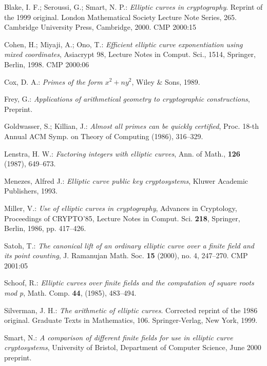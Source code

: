 \documentclass[final]{mcom-l}
\begin{document}

\begin{thebibliography}{10}

 Blake, I. F.; Seroussi, G.; Smart, N. P.: \emph{Elliptic curves in
cryptography}. Reprint of the 1999 original. London Mathematical
Society Lecture Note Series, 265. Cambridge University Press,
Cambridge, 2000. CMP {2000:15}

 Cohen, H.; Miyaji, A.; Ono, T.: \emph{Efficient elliptic curve
exponentiation using mixed coordinates}, Asiacrypt 98, Lecture
Notes in Comput. Sci., 1514, Springer, Berlin, 1998. CMP {2000:06}

 Cox, D. A.: \emph{Primes of the form $x^2+ny^2$}, Wiley \& Sons,
1989. 

 Frey, G.: \emph{Applications of arithmetical geometry to
cryptographic constructions}, Preprint.

 Goldwasser, S.; Killian, J.: \emph{Almost all primes can be quickly
certified}, Proc. 18-th Annual ACM Symp. on Theory of Computing (1986),
316--329.

 Lenstra, H. W.: \emph{Factoring integers with elliptic curves},
Ann. of Math., \textbf{126} (1987), 649--673. 

 Menezes, Alfred J.: \emph{Elliptic curve public key cryptosystems},
Kluwer Academic Publishers, 1993. 

 Miller, V.: \emph{Use of elliptic curves in cryptography}, Advances
in Cryptology, Proceedings of CRYPTO'85, Lecture Notes in
Comput. Sci. \textbf{218}, Springer, Berlin, 1986, pp. 417--426. 

 Satoh, T.: \emph{The canonical lift of an ordinary elliptic curve
over a finite field and its point counting}, J. Ramanujan Math.
Soc. \textbf{15} (2000), no. 4, 247--270. CMP {2001:05}

 Schoof, R.: \emph{Elliptic curves over finite fields and the
computation of square roots mod p}, Math. Comp. \textbf{44},
(1985), 483--494. 

 Silverman, J. H.: \emph{The arithmetic of elliptic curves}.
Corrected reprint of the 1986 original.  Graduate Texts in Mathematics, 106.
Springer-Verlag, New York, 1999. 

 Smart, N.: \emph{A comparison of different finite fields for use
in elliptic curve cryptosystems}, University of Bristol, Department of Computer
Science, June 2000 preprint.

\end{thebibliography}

\address{\noindent Preda Mih\u{a}ilescu,\newline $M_EC$ Consulting and Gesamthochschule Paderborn,
\newline Germany}
\address{F. Pappalardi\newline Dipartimento di Matematica\newline Universit\`a degli studi Roma Tre\newline Largo
S. L. Murialdo 1\newline I-00146 Roma\newline Italy}
\end{document}
